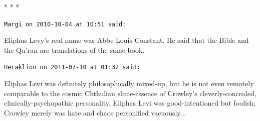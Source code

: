 
\begin{center}* * *\end{center}

\begin{footnotesize}
\begin{sffamily}
\texttt{Margi on 2010-10-04 at 10:51 said:}

Eliphus Levy's real name was Abbe Louis Constant. He said that the Bible and the Qu'ran are translations of the same book.

\hfill

\texttt{Heraklion on 2011-07-10 at 01:32 said:}

Eliphas Levi was definitely philosophically mixed-up, but he is not even remotely comparable to the cosmic Chthulian slime-essence of Crowley's cleverly-concealed, clinically-psychopathic personality. Eliphas Levi was good-intentioned but foolish; Crowley merely was hate and chaos personified vacuously... 

\hfill

\end{sffamily}
\end{footnotesize}

